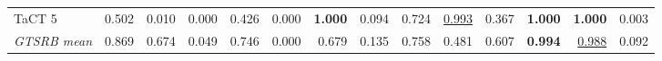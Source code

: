 \begin{table}[htbp]
\begin{adjustbox}{max width=\linewidth}
\begin{tabular}{lrrrrrrrrrrrrr}
TaCT 5 & 0.502 & \textcolor{black!45}{0.010} & \textcolor{black!45}{0.000} & \textcolor{black!45}{0.426} & \textcolor{black!45}{0.000} & \textbf{1.000} & \textcolor{black!45}{0.094} & 0.724 & \underline{0.993} & \textcolor{black!45}{0.367} & \textbf{1.000} & \textbf{1.000} & \textcolor{black!45}{0.003} \\
\rowcolor{black!8}\emph{GTSRB mean} & 0.869 & 0.674 & \textcolor{black!45}{0.049} & 0.746 & \textcolor{black!45}{0.000} & 0.679 & \textcolor{black!45}{0.135} & 0.758 & \textcolor{black!45}{0.481} & 0.607 & \textbf{0.994} & \underline{0.988} & \textcolor{black!45}{0.092} \\
\bottomrule
\end{tabular}
\end{adjustbox}
\end{table}
